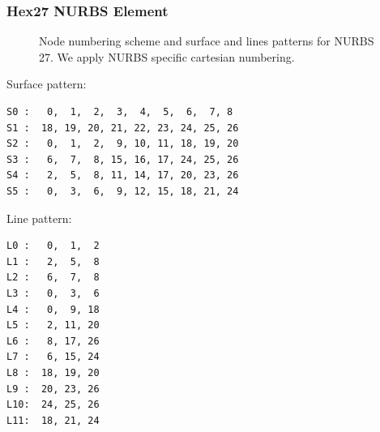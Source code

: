 \subsubsection{Hex27 NURBS Element}
\begin{figure}[h!]
\begin{center}
\caption{Node numbering scheme and surface and lines patterns for NURBS 27. We apply NURBS specific cartesian numbering.}
\label{fig:conventions:hex27nurbs}
\end{center}
\end{figure}

Surface pattern:
\begin{verbatim}
S0 :   0,  1,  2,  3,  4,  5,  6,  7, 8
S1 :  18, 19, 20, 21, 22, 23, 24, 25, 26
S2 :   0,  1,  2,  9, 10, 11, 18, 19, 20
S3 :   6,  7,  8, 15, 16, 17, 24, 25, 26
S4 :   2,  5,  8, 11, 14, 17, 20, 23, 26
S5 :   0,  3,  6,  9, 12, 15, 18, 21, 24
\end{verbatim}

Line pattern:
\begin{verbatim}
L0 :   0,  1,  2
L1 :   2,  5,  8
L2 :   6,  7,  8
L3 :   0,  3,  6
L4 :   0,  9, 18
L5 :   2, 11, 20
L6 :   8, 17, 26
L7 :   6, 15, 24
L8 :  18, 19, 20
L9 :  20, 23, 26
L10:  24, 25, 26
L11:  18, 21, 24
\end{verbatim}

